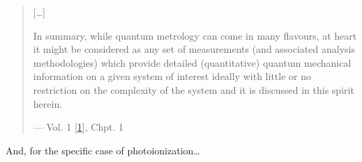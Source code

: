 \documentclass[letterpaper,table,10pt,english]{jupyterBook}
\begin{document}
\begin{quote}
\sphinxAtStartPar
{[}…{]}

\sphinxAtStartPar
In summary, while quantum metrology can come in many flavours, at heart it might be considered as any set of measurements (and associated analysis methodologies) which provide detailed (quantitative) quantum mechanical information on a given system of interest \sphinxhyphen{} ideally with little or no restriction on the complexity of the system \sphinxhyphen{} and it is discussed in this spirit herein.

\begin{flushright}
--- Vol. 1 {[}\hyperlink{cite.backmatter/bibliography:id613}{1}{]}, Chpt. 1
\end{flushright}
\end{quote}

\sphinxAtStartPar
And, for the specific case of photoionization…
\end{document}

